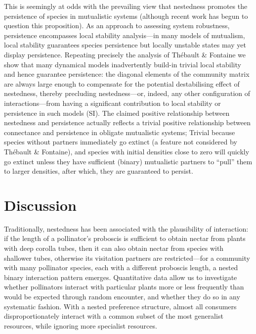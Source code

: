 \documentclass[pdftex]{nature}
\begin{document}
This is seemingly at odds with the prevailing view that nestedness
promotes the persistence of species in mutualistic
systems\cite{Bastolla2009,TFScience2010} (although recent work has
begun to question this proposition\cite{James2012}).  As an approach
to assessing system robustness, persistence encompasses local
stability analysis---in many models of mutualism, local stability
guarantees species persistence but locally unstable states may yet
display persistence.  Repeating precisely the analysis of Th\'ebault
\& Fontaine\cite{TFScience2010} we show that many dynamical models
inadvertently build-in trivial local stability and hence guarantee
persistence: the diagonal elements of the community matrix are always
large enough to compensate for the potential destabilising effect of
nestedness, thereby precluding nestedness---or, indeed, any other
configuration of interactions---from having a significant contribution
to local stability or persistence in such models (SI).  The claimed
positive relationship between nestedness and persistence actually
reflects a trivial positive relationship between connectance and
persistence in obligate mutualistic systems; Trivial because species
without partners immediately go extinct (a feature not considered by
Th\'ebault \& Fontaine\cite{TFScience2010}), and species with initial
densities close to zero will quickly go extinct unless they have
sufficient (binary) mutualistic partners to ``pull'' them to larger
densities, after which, they are guaranteed to
persist\cite{AllesinaComment}.

\section*{Discussion}
\vspace{-0.5cm}
Traditionally, nestedness has been associated with the
plausibility of interaction: if the length of a pollinator's proboscis
is sufficient to obtain nectar from plants with deep corolla tubes,
then it can also obtain nectar from species with shallower tubes,
otherwise its visitation partners are restricted---for a community
with many pollinator species, each with a different proboscis length,
a nested binary interaction pattern emerges.  Quantitative data allow
us to investigate whether pollinators interact with particular plants
more or less frequently than would be expected through random
encounter, and whether they do so in any systematic fashion.  With a
nested preference structure, almost all consumers disproportionately
interact with a common subset of the most generalist resources, while
ignoring more specialist resources.
\end{document}
